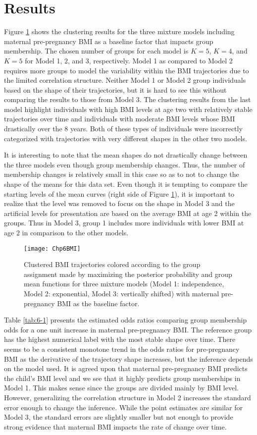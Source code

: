 \section{Results}
Figure \ref{fig:6-1} shows the clustering results for the three mixture models including maternal pre-pregnancy BMI as a baseline factor that impacts group membership. The chosen number of groups for each model is $K = 5$, $K=4$, and $K=5$ for Model 1, 2, and 3, respectively. Model 1 as compared to Model 2 requires more groups to model the variability within the BMI trajectories due to the limited correlation structure. Neither Model 1 or Model 2 group individuals based on the shape of their trajectories, but it is hard to see this without comparing the results to those from Model 3. The clustering results from the last model highlight individuals with high BMI levels at age two with relatively stable trajectories over time and individuals with moderate BMI levels whose BMI drastically over the 8 years. Both of these types of individuals were incorrectly categorized with trajectories with very different shapes in the other two models.

It is interesting to note that the mean shapes do not drastically change between the three models even though group membership changes. Thus, the number of membership changes is relatively small in this case so as to not to change the shape of the means for this data set. Even though it is tempting to compare the starting levels of the mean curves (right side of Figure \ref{fig:6-1}), it is important to realize that the level was removed to focus on the shape in Model 3 and the artificial levels for presentation are based on the average BMI at age 2 within the groups. Thus in Model 3, group 1 includes more individuals with lower BMI at age 2 in comparison to the other models. 

\begin{figure}[h]
\centering
\texttt{[image: Chp6BMI]}
\caption{Clustered BMI trajectories colored according to the group assignment made by maximizing the posterior probability and group mean functions for three mixture models (Model 1: independence, Model 2: exponential, Model 3: vertically shifted) with maternal pre-pregnancy BMI as the baseline factor.}
\label{fig:6-1}
\end{figure}

Table \ref{tab:6-1} presents the estimated odds ratios comparing group membership odds for a one unit increase in maternal pre-pregnancy BMI. The reference group has the highest numerical label with the most stable shape over time. There seems to be a consistent monotone trend in the odds ratios for pre-pregnancy BMI as the derivative of the trajectory shape increases, but the inference depends on the model used. It is agreed upon that maternal pre-pregnancy BMI predicts the child's BMI level and we see that it highly predicts group memberships in Model 1. This makes sense since the groups are divided mainly by BMI level. However, generalizing the correlation structure in Model 2 increases the standard error enough to change the inference. While the point estimates are similar for Model 3, the standard errors are slightly smaller but not enough to provide strong evidence that maternal BMI impacts the rate of change over time. 

